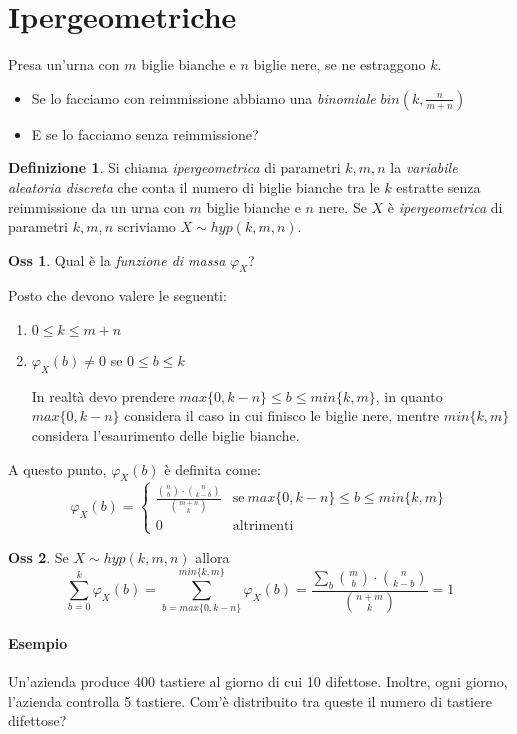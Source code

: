 \documentclass[12pt, a4paper]{report}
\theoremstyle{definition}
\newtheorem{definition}{Definizione}[section]
\newtheorem*{observation}{Oss}
\begin{document}
\section{Ipergeometriche}
Presa un'urna con $m$ biglie bianche e $n$ biglie nere, se ne estraggono $k$.
\begin{itemize}
	\item Se lo facciamo con reimmissione abbiamo una \emph{binomiale} $bin\left(
	k, \frac{n}{m+n}\right)$
	\item E se lo facciamo senza reimmissione?
\end{itemize}
\begin{definition}
	Si chiama \emph{ipergeometrica} di parametri $k,m,n$ la \emph{variabile
	aleatoria discreta} che conta il numero di biglie bianche tra le $k$ estratte
	senza reimmissione da un urna con $m$ biglie bianche e $n$ nere. Se $X$ è
	\emph{ipergeometrica} di parametri $k,m,n$ scriviamo \(X\sim hyp(k,m,n)\).
\end{definition}
\begin{observation}
	Qual è la \emph{funzione di massa} \(\varphi_X\)?

	Posto che devono valere le seguenti:
	\begin{enumerate}[label=(\roman*)]
		\item \(0\leq k\leq m+n\)
		\item \(\varphi_X(b)\neq 0\) se \(0\leq b\leq k\)

		In realtà devo prendere \(max\{0,k-n\}\leq b\leq min\{k,m\}\), in quanto \(
		max\{0,k-n\}\) considera il caso in cui finisco le biglie nere, mentre \(
		min\{k,m\}\) considera l'esaurimento delle biglie bianche.
	\end{enumerate}
	A questo punto, $\varphi_X(b)$ è definita come:
	\[\varphi_X(b)=\begin{cases}
		{\frac{\binom{n}{b}\cdot \binom{n}{k-b}}{\binom{m+n}{k}}} & \text{se}\ {max\{
		0,k-n\}\leq b\leq min\{k,m\}}\\
		{0} & \text{altrimenti}
	\end{cases}\]
\end{observation}
\begin{observation}
	Se \(X\sim hyp(k,m,n)\) allora \[\sum_{b=0}^k\varphi_X(b)=\sum_{b=max\{0,k-n\}
	}^{min\{k,m\}}\varphi_X(b)=\frac{\sum_b\binom{m}{b}\cdot \binom{n}{k-b}}{\binom
	{n+m}{k}}=1\]
\end{observation}

\paragraph*{Esempio}
Un'azienda produce 400 tastiere al giorno di cui 10 difettose. Inoltre, ogni giorno,
l'azienda controlla 5 tastiere. Com'è distribuito tra queste il numero di tastiere
difettose?
\end{document}
